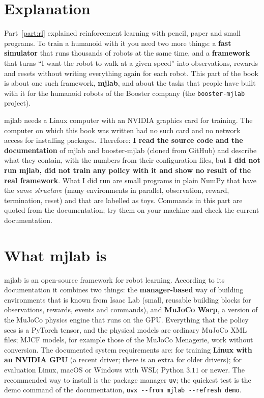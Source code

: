 \label{ch:mj1}

\section*{Explanation}
Part~\ref{part:rl} explained reinforcement learning with pencil, paper and small programs. To train a humanoid with it you need two more things: a \textbf{fast simulator} that runs thousands of robots at the same time, and a \textbf{framework} that turns ``I want the robot to walk at a given speed'' into observations, rewards and resets without writing everything again for each robot. This part of the book is about one such framework, \textbf{mjlab}, and about the tasks that people have built with it for the humanoid robots of the Booster company (the \texttt{booster-mjlab} project).

\begin{keyidea}
mjlab needs a Linux computer with an NVIDIA graphics card for training. The computer on which this book was written had no such card and no network access for installing packages. Therefore: \textbf{I read the source code and the documentation} of mjlab and booster-mjlab (cloned from GitHub) and describe what they contain, with the numbers from their configuration files, but \textbf{I did not run mjlab, did not train any policy with it and show no result of the real framework}. What I did run are small programs in plain NumPy that have the \emph{same structure} (many environments in parallel, observation, reward, termination, reset) and that are labelled as toys. Commands in this part are quoted from the documentation; try them on your machine and check the current documentation.
\end{keyidea}

\section*{What mjlab is}
mjlab is an open-source framework for robot learning. According to its documentation it combines two things: the \textbf{manager-based} way of building environments that is known from Isaac Lab (small, reusable building blocks for observations, rewards, events and commands), and \textbf{MuJoCo Warp}, a version of the MuJoCo physics engine that runs on the GPU. Everything that the policy sees is a PyTorch tensor, and the physical models are ordinary MuJoCo XML files; MJCF models, for example those of the MuJoCo Menagerie, work without conversion. The documented system requirements are: for training \textbf{Linux with an NVIDIA GPU} (a recent driver; there is an extra for older drivers); for evaluation Linux, macOS or Windows with WSL; Python $3.11$ or newer. The recommended way to install is the package manager \texttt{uv}; the quickest test is the demo command of the documentation, \verb!uvx --from mjlab --refresh demo!.


